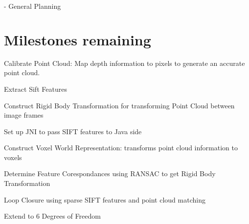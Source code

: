 \documentclass[12pt]{article}
\begin{document}
- General Planning

\section{Milestones remaining}
Calibrate Point Cloud: Map depth information to pixels to generate an accurate point cloud.

Extract Sift Features

Construct Rigid Body Transformation for transforming Point Cloud between image frames

Set up JNI to pass SIFT features to Java side

Construct Voxel World Representation: transforms point cloud information to voxels

Determine Feature Corespondances using RANSAC to get Rigid Body Transformation 

Loop Closure using sparse SIFT features and point cloud matching

Extend to 6 Degrees of Freedom
\end{document}
